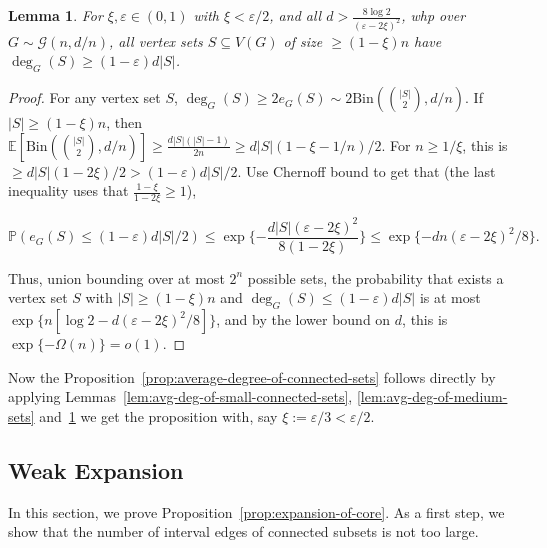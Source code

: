 \documentclass[11pt]{article}
\theoremstyle{plain}
\newtheorem{lemma}[theorem]{Lemma}
\let\epsilon=\varepsilon
\newcommand{\G}{\mathcal{G}}
\newcommand{\E}{\mathds{E}}
\renewcommand{\P}{\mathds{P}}
\newcommand{\1}{\mathbb{1}}
\newcommand{\Bin}{\text{Bin}}
\begin{document}
\begin{lemma}\label{lem:avg-deg-of-large-sets}
    For \(\xi,\epsilon\in(0,1)\) with \(\xi < \epsilon / 2\), and all \(d > \frac{8\log 2}{(\epsilon - 2\xi)^2}\), whp over \(G\sim\G(n,d/n)\), \emph{all} vertex sets \(S\subseteq V(G)\) of size \(\geq(1-\xi)n\) have \(\deg_G(S)\geq(1-\epsilon)d|S|\).
\end{lemma}
\begin{proof}
    For any vertex set \(S\), \(\deg_G(S)\geq 2e_G(S)\sim 2\Bin(\binom{|S|}{2}, d/n)\). If \(|S|\geq (1-\xi)n\), then \(\E[\Bin(\binom{|S|}{2},d/n)] \geq \frac{d|S|(|S| - 1)}{2n} \geq d|S|(1-\xi - 1/n)/2\). For \(n \geq1/\xi\), this is \(\geq d|S|(1-2\xi)/2 > (1-\epsilon)d|S|/2\). Use Chernoff bound
to get that (the last inequality uses that \(\frac{1-\xi}{1-2\xi}\geq 1\)),

    \[
    \P(e_G(S)\leq (1-\epsilon)d|S|/2)\leq \exp\{-\frac{d|S|(\epsilon-2\xi)^2}{8(1-2\xi)}\} \leq \exp\{-dn(\epsilon-2\xi)^2/8\}.
    \]
    
    Thus, union bounding over at most \(2^n\) possible sets, the probability that exists a vertex set \(S\) with \(|S|\geq(1-\xi)n\) and \(\deg_G(S)\leq (1-\epsilon)d|S|\) is at most \(\exp\{n[\log 2 - d(\epsilon-2\xi)^2/8]\}\), and by the lower bound on \(d\), this is \(\exp\{-\Omega(n)\} = o(1)\).
\end{proof}

Now the Proposition~\ref{prop:average-degree-of-connected-sets} follows directly by applying Lemmas~\ref{lem:avg-deg-of-small-connected-sets}, \ref{lem:avg-deg-of-medium-sets} and~\ref{lem:avg-deg-of-large-sets} we get the proposition with, say \(\xi := \epsilon / 3 < \epsilon/2\).

\subsection{Weak Expansion}
\label{proof:propexpansion}

In this section, we prove Proposition~\ref{prop:expansion-of-core}. As a first step, we show that the number of interval edges of connected subsets is not too large.
\end{document}
